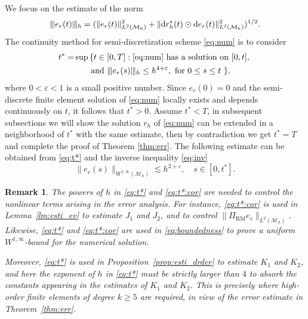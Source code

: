 \documentclass[11pt,a4paper,oneside,reqno]{amsart}
\theoremstyle{definition}
\theoremstyle{plain}
\newtheorem{remark}{Remark}[section]
\numberwithin{theorem}{section}
\numberwithin{proposition}{section}
\numberwithin{lemma}{section}
\numberwithin{equation}{section}
\newcommand{\Man}{\mathcal{M}}
\newcommand{\RM}{\mathrm{RM}}
\newcommand{\normt}[1]{%
	\vert\kern-0.9pt\vert\kern-0.9pt\vert #1
	\vert\kern-0.9pt\vert\kern-0.9pt\vert}
\begin{document}
\smallskip

We focus on the estimate of the norm
\[
\normt{e_r(t)}_h  = (\|e_r( t)\|_{L^2(\Man_h)}^2 + \|\mathrm{d} r_h^*(t) \odot \mathrm{d} e_r(t)\|_{L^2(\Man_h)}^2)^{1/2}. 
\] 
The continuity method for semi-discretization scheme \eqref{eq:num} is to consider 
\begin{equation}\label{eq:t*} 
\begin{split}
    t^*=&\sup\left\{ t \in [0, T]: \eqref{eq:num} \text{ has a solution on } [0,t],  \right. \\
     &\quad\quad \text{and } \normt{e_r(s)}_h \leq h^{4 + \varepsilon}, \text{ for } 0 \leq s \leq t\ \},
\end{split} 
\end{equation}
where $0<\varepsilon<1$ is a small positive number. 
Since \( e_r(0) = 0 \) and the semi-discrete finite element solution of \eqref{eq:num} locally exists  and depends continuously on $t$, it follows that \( t^* > 0 \). Assume \( t^* < T\), in subsequent subsections we will show the solution $r_h$ of \eqref{eq:num} can be extended in a neighborhood of $t^*$ with the same estimate, then by contradiction we get \( t^* = T\) and complete the proof of Theorem \ref{thm:err}. The following estimate can be obtained from \eqref{eq:t*} and the inverse inequality \eqref{eq:inv}
\begin{equation}\label{eq:t*:cor}
    \|  e_{r}(s) \|_{W^{1,\infty}(\Man_h)}\lesssim h^{2+\varepsilon}, \quad s \in [0,t^*].
\end{equation}

\begin{remark}
\upshape
The powers of \(h\) in \eqref{eq:t*} and \eqref{eq:t*:cor} are needed to control the nonlinear terms arising in the error analysis.
For instance, \eqref{eq:t*:cor} is used in Lemma~\ref{lm:esti_ev} to estimate \(J_1\) and \(J_2\), and to control
\(\|\Pi_{\RM} e_v\|_{L^2(\Man_h)}\).
Likewise, \eqref{eq:t*} and \eqref{eq:t*:cor} are used in \eqref{eq:boundedness} to prove a uniform \(W^{1,\infty}\)-bound for the numerical solution.

Moreover, \eqref{eq:t*} is used in Proposition~\ref{prop:esti_drder} to estimate \(K_1\) and \(K_2\), and here the exponent of \(h\) in \eqref{eq:t*} must be strictly larger than \(4\) to absorb the constants appearing in the estimates of \(K_1\) and \(K_2\).
This is precisely where high-order finite elements of degree \(k\ge 5\) are required, in view of the error estimate in Theorem~\ref{thm:err}.
\end{remark}
\end{document}
